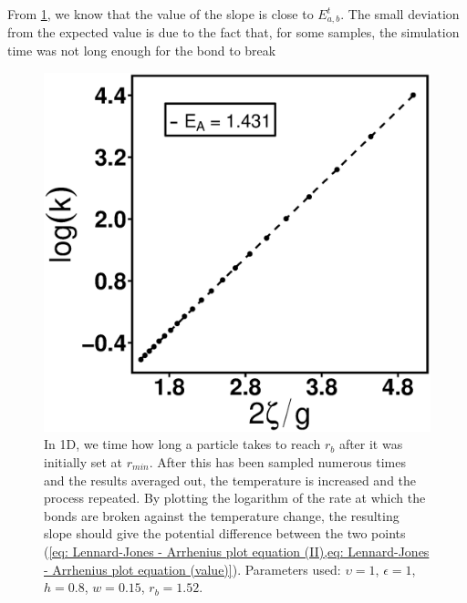 \documentclass[../../main.tex]{subfiles}
\begin{document}
    From \cref{fig: arrhenius}, we know that the value of the slope is close to $E_{a,b}^t$. The small deviation from the expected value is due to the fact that, for some samples, the simulation time was not long enough for the bond to break
        \begin{figure}[h]
            \centering
            \includegraphics[scale = 0.4]{Figures/Arrhenius.eps}
            \caption{In 1D, we time how long a particle takes to reach $r_b$ after it was initially set at $r_{min}$. After this has been sampled numerous times and the results averaged out, the temperature is increased and the process repeated. By plotting the logarithm of the rate at which the bonds are broken against the temperature change, the resulting slope should give the potential difference between the two points (\cref{eq: Lennard-Jones - Arrhenius plot equation (II),eq: Lennard-Jones - Arrhenius plot equation (value)}). Parameters used: $\upsilon = 1$, $\epsilon = 1$, $h = 0.8$, $w = 0.15$, $r_b = 1.52$.}
            \label{fig: arrhenius}
        \end{figure}
    
\end{document}
